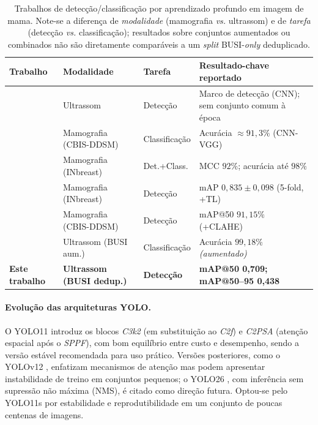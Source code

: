 \documentclass[11pt,a4paper]{article}
\begin{document}
\begin{table}[t]
\centering
\caption{Trabalhos de detecção/classificação por aprendizado profundo em imagem
de mama. Note-se a diferença de \emph{modalidade} (mamografia \textit{vs.}
ultrassom) e de \emph{tarefa} (detecção \textit{vs.} classificação); resultados
sobre conjuntos aumentados ou combinados não são diretamente comparáveis a um
\textit{split} BUSI-\textit{only} deduplicado.}
\label{tab:related}
\small
\begin{tabularx}{\linewidth}{@{}l l l X@{}}
\toprule
\textbf{Trabalho} & \textbf{Modalidade} & \textbf{Tarefa} & \textbf{Resultado-chave reportado} \\
\midrule
\citet{yap2018}      & Ultrassom              & Detecção      & Marco de detecção (CNN); sem conjunto comum à época \\
\citet{wurzel2022}   & Mamografia (CBIS-DDSM) & Classificação & Acurácia $\approx 91{,}3\%$ (CNN-VGG) \\
\citet{anas2024}     & Mamografia (INbreast)  & Det.+Class.   & MCC $92\%$; acurácia até $98\%$ \\
\citet{prinzi2024}   & Mamografia (INbreast)  & Detecção      & mAP $0{,}835\pm0{,}098$ (5-fold, +TL) \\
\citet{mohammed2024} & Mamografia (CBIS-DDSM) & Detecção      & mAP@50 $91{,}15\%$ (+CLAHE) \\
\citet{jabeen2022}   & Ultrassom (BUSI aum.)  & Classificação & Acurácia $99{,}18\%$ \emph{(aumentado)} \\
\textbf{Este trabalho} & \textbf{Ultrassom (BUSI dedup.)} & \textbf{Detecção} & \textbf{mAP@50 0,709; mAP@50--95 0,438} \\
\bottomrule
\end{tabularx}
\end{table}

\paragraph{Evolução das arquiteturas YOLO.} O YOLO11 \citep{jocher2024,khanam2024}
introduz os blocos \textit{C3k2} (em substituição ao \textit{C2f}) e \textit{C2PSA}
(atenção espacial após o \textit{SPPF}), com bom equilíbrio entre custo e
desempenho, sendo a versão estável recomendada para uso prático. Versões
posteriores, como o YOLOv12 \citep{tian2025}, enfatizam mecanismos de atenção mas
podem apresentar instabilidade de treino em conjuntos pequenos; o YOLO26
\citep{ultralytics2026}, com inferência sem supressão não máxima (NMS), é citado
como direção futura. Optou-se pelo YOLO11s por estabilidade e reprodutibilidade
em um conjunto de poucas centenas de imagens.
\end{document}
